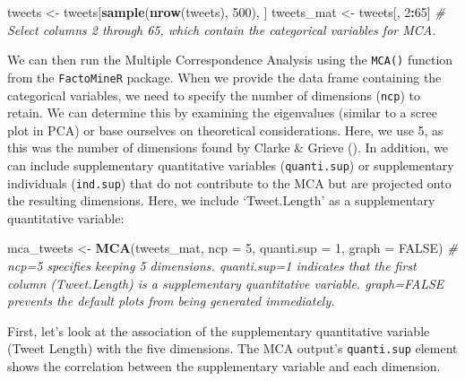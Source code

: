 \documentclass[
]{book}
\newenvironment{Shaded}{\begin{snugshade}}{\end{snugshade}}
\newcommand{\AttributeTok}[1]{\textcolor[rgb]{0.13,0.29,0.53}{#1}}
\newcommand{\CommentTok}[1]{\textcolor[rgb]{0.56,0.35,0.01}{\textit{#1}}}
\newcommand{\ConstantTok}[1]{\textcolor[rgb]{0.56,0.35,0.01}{#1}}
\newcommand{\DecValTok}[1]{\textcolor[rgb]{0.00,0.00,0.81}{#1}}
\newcommand{\FunctionTok}[1]{\textcolor[rgb]{0.13,0.29,0.53}{\textbf{#1}}}
\newcommand{\NormalTok}[1]{#1}
\newcommand{\OtherTok}[1]{\textcolor[rgb]{0.56,0.35,0.01}{#1}}
\newcommand{\SpecialCharTok}[1]{\textcolor[rgb]{0.81,0.36,0.00}{\textbf{#1}}}
\begin{document}
\begin{Shaded}
\begin{Highlighting}[]
\NormalTok{tweets }\OtherTok{\textless{}{-}}\NormalTok{ tweets[}\FunctionTok{sample}\NormalTok{(}\FunctionTok{nrow}\NormalTok{(tweets), }\DecValTok{500}\NormalTok{), ]}
\NormalTok{tweets\_mat }\OtherTok{\textless{}{-}}\NormalTok{ tweets[, }\DecValTok{2}\SpecialCharTok{:}\DecValTok{65}\NormalTok{]  }\CommentTok{\# Select columns 2 through 65, which contain the categorical variables for MCA.}
\end{Highlighting}
\end{Shaded}

We can then run the Multiple Correspondence Analysis using the \texttt{MCA()} function from the \texttt{FactoMineR} package. When we provide the data frame containing the categorical variables, we need to specify the number of dimensions (\texttt{ncp}) to retain. We can determine this by examining the eigenvalues (similar to a scree plot in PCA) or base ourselves on theoretical considerations. Here, we use 5, as this was the number of dimensions found by Clarke \& Grieve (). In addition, we can include supplementary quantitative variables (\texttt{quanti.sup}) or supplementary individuals (\texttt{ind.sup}) that do not contribute to the MCA but are projected onto the resulting dimensions. Here, we include `Tweet.Length' as a supplementary quantitative variable:

\begin{Shaded}
\begin{Highlighting}[]
\NormalTok{mca\_tweets }\OtherTok{\textless{}{-}} \FunctionTok{MCA}\NormalTok{(tweets\_mat, }\AttributeTok{ncp =} \DecValTok{5}\NormalTok{, }\AttributeTok{quanti.sup =} \DecValTok{1}\NormalTok{, }\AttributeTok{graph =} \ConstantTok{FALSE}\NormalTok{)  }\CommentTok{\# \textquotesingle{}ncp=5\textquotesingle{} specifies keeping 5 dimensions. \textquotesingle{}quanti.sup=1\textquotesingle{} indicates that the first column (Tweet.Length) is a supplementary quantitative variable. \textquotesingle{}graph=FALSE\textquotesingle{} prevents the default plots from being generated immediately.}
\end{Highlighting}
\end{Shaded}

First, let's look at the association of the supplementary quantitative variable (Tweet Length) with the five dimensions. The MCA output's \texttt{quanti.sup} element shows the correlation between the supplementary variable and each dimension.
\end{document}
